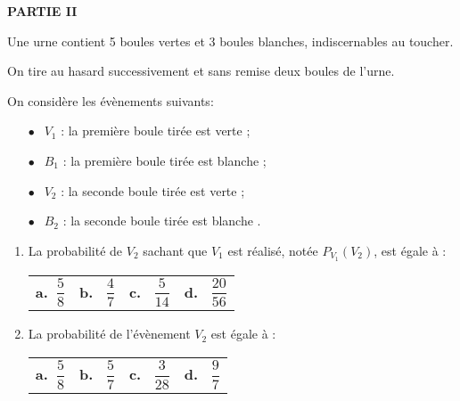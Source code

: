 \medskip

\textbf{PARTIE II}

\medskip

Une urne contient 5 boules vertes et 3 boules blanches, indiscernables au toucher. 

On tire au hasard successivement et sans remise deux boules de l'urne.

On considère les évènements suivants:

\setlength\parindent{1cm}
\begin{itemize}
\item[$\bullet~~$] $V_1$ : \og la première boule tirée est verte \fg{} ;
\item[$\bullet~~$] $B_1$ : \og la première boule tirée est blanche \fg{} ;
\item[$\bullet~~$] $V_2$ : \og la seconde boule tirée est verte \fg{} ;
\item[$\bullet~~$] $B_2$ : \og la seconde boule tirée est blanche \fg.
\end{itemize}
\setlength\parindent{0cm}

\begin{enumerate}[resume]
\item  La probabilité de $V_2$ sachant que $V_1$ est réalisé, notée $P_{V_1}\left(V_2\right)$, est égale à :
\begin{center}
\begin{tabularx}{\linewidth}{*{4}{X}}
\textbf{a.~}$\dfrac{5}{8}$&\textbf{b.~} $\dfrac{4}{7}$&\textbf{c.~} $\dfrac{5}{14}$&\textbf{d.~}
$\dfrac{20}{56}$ 
\end{tabularx}
\end{center}
\item La probabilité de l'évènement $V_2$ est égale à :
\begin{center}
\begin{tabularx}{\linewidth}{*{4}{X}}
\textbf{a.~}$\dfrac{5}{8}$&\textbf{b.~} $\dfrac{5}{7}$&\textbf{c.~} $\dfrac{3}{28}$&\textbf{d.~}
$\dfrac{9}{7}$ 
\end{tabularx}
\end{center}
\end{enumerate}

\bigskip

